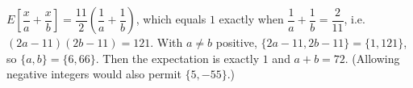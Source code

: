 $E\left[\dfrac xa+\dfrac xb\right]=\dfrac{11}{2}\left(\dfrac1a+\dfrac1b\right)$, which equals $1$ exactly when $\dfrac1a+\dfrac1b=\dfrac2{11}$, i.e. $(2a-11)(2b-11)=121$. With $a\ne b$ positive, $\{2a-11,2b-11\}=\{1,121\}$, so $\{a,b\}=\{6,66\}$. Then the expectation is exactly $1$ and $a+b=\boxed{72}$. (Allowing negative integers would also permit $\{5,-55\}$.)
